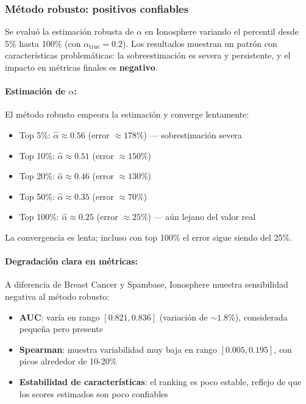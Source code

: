 \documentclass[a4paper,11pt]{article}
\begin{document}
\subsubsection{Método robusto: positivos confiables}

Se evaluó la estimación robusta de $\alpha$ en Ionosphere variando el percentil desde 5\% hasta 100\% (con $\alpha_{\text{true}}=0.2$). Los resultados muestran un patrón con características problemáticas: la sobreestimación es severa y persistente, y el impacto en métricas finales es \textbf{negativo}.

\paragraph{Estimación de $\alpha$:} El método robusto empeora la estimación y converge lentamente:
\begin{itemize}
    \item Top 5\%: $\hat{\alpha} \approx 0.56$ (error $\approx 178\%$) — sobrestimación severa
    \item Top 10\%: $\hat{\alpha} \approx 0.51$ (error $\approx 150\%$)
    \item Top 20\%: $\hat{\alpha} \approx 0.46$ (error $\approx 130\%$)
    \item Top 50\%: $\hat{\alpha} \approx 0.35$ (error $\approx 70\%$)
    \item Top 100\%: $\hat{\alpha} \approx 0.25$ (error $\approx 25\%$) — aún lejano del valor real
\end{itemize}

La convergencia es lenta; incluso con top 100\% el error sigue siendo del 25\%.

\paragraph{Degradación clara en métricas:} A diferencia de Breast Cancer y Spambase, Ionosphere muestra sensibilidad negativa al método robusto:

\begin{itemize}
    \item \textbf{AUC}: varía en rango $[0.821, 0.836]$ (variación de $\sim 1.8\%$), considerada pequeña pero presente
    \item \textbf{Spearman}: muestra variabilidad muy baja en rango $[0.005, 0.195]$, con picos alrededor de 10-20\%
    \item \textbf{Estabilidad de características}: el ranking es poco estable, reflejo de que los scores estimados son poco confiables
\end{itemize}
\end{document}
